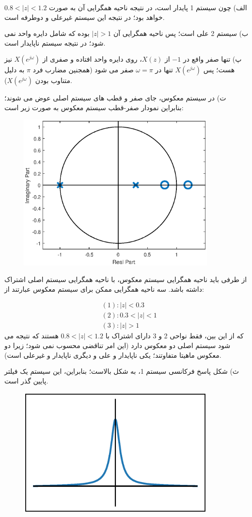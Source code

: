 \documentclass[10pt,letterpaper]{article}
\newcommand{\qn}[1]{
\[
\begin{split}
#1
\end{split}
\]
}
\begin{document}
الف) چون سیستم 1 پایدار است، در نتیجه ناحیه همگرایی آن به صورت 
$
0.8<|z|<1.2
$
 خواهد بود؛ در نتیجه این سیستم غیرعلی و دوطرفه است.

ب) سیستم 2 علی است؛ پس ناحیه همگرایی آن 
$
|z|>1
$
 بوده که شامل دایره واحد نمی شود؛ در نتیجه سیستم ناپایدار است.

پ) تنها صفر وافع در $-1$ از $X(z)$، روی دایره واحد افتاده و صفری از 
$
X(e^{j\omega})
$
 نیز هست؛ پس 
$
X(e^{j\omega})
$
 تنها در 
$
\omega=\pi
$
 صفر می شود (همجنین مضارب فرد $\pi$ به دلیل متناوب بودن $X(e^{j\omega})$).

ت) در سیستم معکوس، جای صفر و قطب های سیستم اصلی عوض می شوند؛ بنابراین نمودار صفر-قطب سیستم معکوس به صورت زیر است:
\vspace{0.15cm}
\begin{figure}[h!]
\centering
\includegraphics[width=100mm]{PSol12_Q3.eps}
\end{figure}

از طرفی باید ناحیه همگرایی سیستم معکوس، با ناحیه همگرایی سیستم اصلی اشتراک داشته باشد. سه ناحیه همگرایی ممکن برای سیستم معکوس عبارتند از:
\qn{
&(1) : |z|<0.3
\\&(2) : 0.3<|z|<1
\\&(3) : |z|>1
}{}
که از این بین، فقط نواحی 2 و 3 دارای اشتراک با 
$
0.8<|z|<1.2
$
هستند که نتیجه می شود سیستم اصلی دو معکوس دارد (این امر تناقضی محسوب نمی شود؛ زیرا دو معکوس ماهیتا متفاوتند؛ یکی ناپایدار و علی و دیگری ناپایدار و غیرعلی است).

ث) شکل پاسخ فرکانسی سیستم 1، به شکل بالاست؛ بنابراین، این سیستم یک فیلتر پایین گذر است.
\vspace{.1cm}
\begin{figure}[h!]
\centering
\includegraphics[width=100mm]{PSol12_Q3_5.eps}
\end{figure}
\vspace{.1cm}
\end{document}
